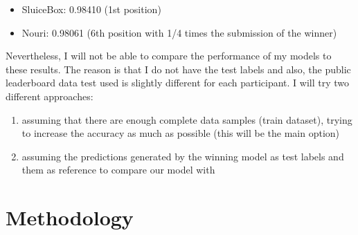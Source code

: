 \documentclass[]{article}
\begin{document}
\begin{itemize}
	\item SluiceBox: 0.98410 (1st position)
	\item Nouri: 0.98061 (6th position with 1/4 times the submission of the winner)
\end{itemize}

Nevertheless, I will not be able to compare the performance of my models to these results. The reason is that I do not have the test labels and also, the public leaderboard data test used is slightly different for each participant. I will try two different approaches:

\begin{enumerate}
	\item assuming that there are enough complete data samples (train dataset), trying to increase the accuracy as much as possible (this will be the main option)
	\item assuming the predictions generated by the winning model as test labels and them as reference to compare our model with
\end{enumerate}

\section{Methodology}\label{iii.-methodology}
\end{document}
